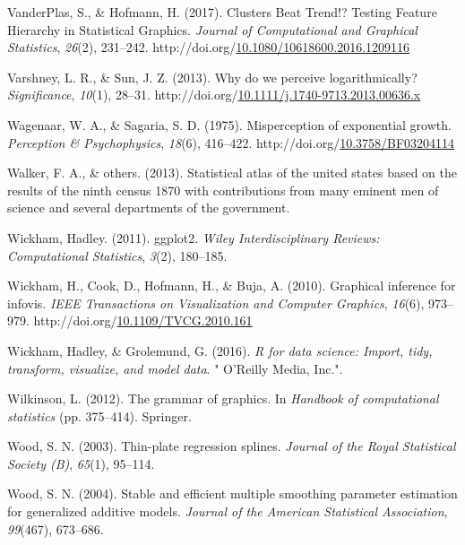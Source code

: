 \documentclass[print]{nuthesis}
\newlength{\cslhangindent}
\newenvironment{CSLReferences}%
{\setlength{\parindent}{0pt}%
\everypar{\setlength{\hangindent}{\cslhangindent}}\ignorespaces}%
{\par}
\begin{document}
\begin{CSLReferences}{1}{0}
\leavevmode\hypertarget{ref-vanderplas_clusters_2017}{}%
VanderPlas, S., \& Hofmann, H. (2017). Clusters {Beat} {Trend}!? {Testing} {Feature} {Hierarchy} in {Statistical} {Graphics}. \emph{Journal of Computational and Graphical Statistics}, \emph{26}(2), 231--242. http://doi.org/\href{https://doi.org/10.1080/10618600.2016.1209116}{10.1080/10618600.2016.1209116}

\leavevmode\hypertarget{ref-varshney_why_2013}{}%
Varshney, L. R., \& Sun, J. Z. (2013). Why do we perceive logarithmically? \emph{Significance}, \emph{10}(1), 28--31. http://doi.org/\href{https://doi.org/10.1111/j.1740-9713.2013.00636.x}{10.1111/j.1740-9713.2013.00636.x}

\leavevmode\hypertarget{ref-wagenaar_misperception_1975}{}%
Wagenaar, W. A., \& Sagaria, S. D. (1975). Misperception of exponential growth. \emph{Perception \& Psychophysics}, \emph{18}(6), 416--422. http://doi.org/\href{https://doi.org/10.3758/BF03204114}{10.3758/BF03204114}

\leavevmode\hypertarget{ref-walker2013statistical}{}%
Walker, F. A., \& others. (2013). Statistical atlas of the united states based on the results of the ninth census 1870 with contributions from many eminent men of science and several departments of the government.

\leavevmode\hypertarget{ref-wickham2011ggplot2}{}%
Wickham, Hadley. (2011). ggplot2. \emph{Wiley Interdisciplinary Reviews: Computational Statistics}, \emph{3}(2), 180--185.

\leavevmode\hypertarget{ref-wickham_graphical_2010}{}%
Wickham, H., Cook, D., Hofmann, H., \& Buja, A. (2010). Graphical inference for infovis. \emph{IEEE Transactions on Visualization and Computer Graphics}, \emph{16}(6), 973--979. http://doi.org/\href{https://doi.org/10.1109/TVCG.2010.161}{10.1109/TVCG.2010.161}

\leavevmode\hypertarget{ref-wickham2016r}{}%
Wickham, Hadley, \& Grolemund, G. (2016). \emph{R for data science: Import, tidy, transform, visualize, and model data}. " O'Reilly Media, Inc.".

\leavevmode\hypertarget{ref-wilkinson2012grammar}{}%
Wilkinson, L. (2012). The grammar of graphics. In \emph{Handbook of computational statistics} (pp. 375--414). Springer.

\leavevmode\hypertarget{ref-mgcv5}{}%
Wood, S. N. (2003). Thin-plate regression splines. \emph{Journal of the Royal Statistical Society (B)}, \emph{65}(1), 95--114.

\leavevmode\hypertarget{ref-mgcv3}{}%
Wood, S. N. (2004). Stable and efficient multiple smoothing parameter estimation for generalized additive models. \emph{Journal of the American Statistical Association}, \emph{99}(467), 673--686.


\end{CSLReferences}
\end{document}
